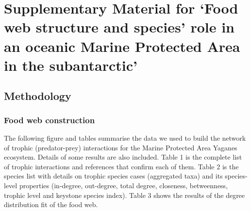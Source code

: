 \documentclass[
]{article}
\author{}
\date{\vspace{-2.5em}}
\begin{document}
\section{Supplementary Material for `Food web structure and species'
role in an oceanic Marine Protected Area in the
subantarctic'}\label{supplementary-material-for-food-web-structure-and-species-role-in-an-oceanic-marine-protected-area-in-the-subantarctic}

\subsection{Methodology}\label{methodology}

\subsubsection{Food web construction}\label{food-web-construction}

The following figure and tables summarise the data we used to build the
network of trophic (predator-prey) interactions for the Marine Protected
Area Yaganes ecosystem. Details of some results are also included. Table
1 is the complete list of trophic interactions and references that
confirm each of them. Table 2 is the species list with details on
trophic species cases (aggregated taxa) and its species-level properties
(in-degree, out-degree, total degree, closeness, betweenness, trophic
level and keystone species index). Table 3 shows the results of the
degree distribution fit of the food web.
\end{document}
